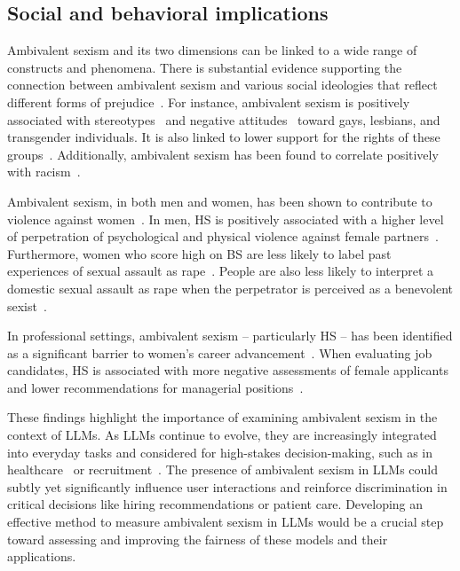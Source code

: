 \documentclass{DESSThesis}
\begin{document}
\subsection{Social and behavioral implications}
\label{sec:background-sexism-implications}

Ambivalent sexism and its two dimensions can be linked to a wide range of constructs and phenomena. 
There is substantial evidence supporting the connection between ambivalent sexism and various social ideologies that reflect different forms of prejudice~\cite{bareket_systematic_2023}. For instance, ambivalent sexism is positively associated with stereotypes~\cite{morrison_construction_2007} and negative attitudes~\cite{pistella_sexism_2018} toward gays, lesbians, and transgender individuals. It is also linked to lower support for the rights of these groups~\cite{masser_contemporary_1999}. Additionally, ambivalent sexism has been found to correlate positively with racism~\cite{glick_ambivalent_1996}.

Ambivalent sexism, in both men and women, has been shown to contribute to violence against women~\cite{bareket_systematic_2023}. In men, HS is positively associated with a higher level of perpetration of psychological and physical violence against female partners~\cite{juarros-basterretxea_considering_2019, zapata-calvente_automatic_2019}. Furthermore, women who score high on BS are less likely to label past experiences of sexual assault as rape~\cite{lemaire_labeling_2016}. People are also less likely to interpret a domestic sexual assault as rape when the perpetrator is perceived as a benevolent sexist~\cite{duran_its_2011}.

In professional settings, ambivalent sexism -- particularly HS -- has been identified as a significant barrier to women's career advancement~\cite{bareket_systematic_2023}. When evaluating job candidates, HS is associated with more negative assessments of female applicants and lower recommendations for managerial positions~\cite{masser_reinforcing_2004}.

These findings highlight the importance of examining ambivalent sexism in the context of LLMs. As LLMs continue to evolve, they are increasingly integrated into everyday tasks and considered for high-stakes decision-making, such as in healthcare~\cite{gumilar_assessment_2024, kim_mdagents_2024} or recruitment~\cite{gan_application_2024}.
The presence of ambivalent sexism in LLMs could subtly yet significantly influence user interactions and reinforce discrimination in critical decisions like hiring recommendations or patient care. Developing an effective method to measure ambivalent sexism in LLMs would be a crucial step toward assessing and improving the fairness of these models and their applications.
\end{document}
